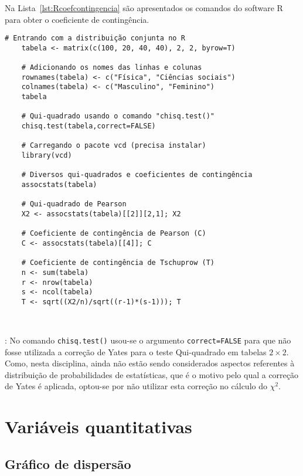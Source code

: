 \documentclass[11pt,fleqn]{book} %
\begin{document}
Na Lista~\ref{lst:Rcoefcontingencia} são apresentados os comandos do software R para obter o coeficiente de contingência.\\

\begin{scriptsize}
	\estiloR
	\begin{lstlisting}[caption={Comandos do software R}, label=lst:Rcoefcontingencia]
	# Entrando com a distribuição conjunta no R
	tabela <- matrix(c(100, 20, 40, 40), 2, 2, byrow=T)
	
	# Adicionando os nomes das linhas e colunas
	rownames(tabela) <- c("Física", "Ciências sociais")
	colnames(tabela) <- c("Masculino", "Feminino")
	tabela

	# Qui-quadrado usando o comando "chisq.test()"
	chisq.test(tabela,correct=FALSE)
	
	# Carregando o pacote vcd (precisa instalar)
	library(vcd)
	
	# Diversos qui-quadrados e coeficientes de contingência
	assocstats(tabela)

	# Qui-quadrado de Pearson
	X2 <- assocstats(tabela)[[2]][2,1]; X2

	# Coeficiente de contingência de Pearson (C)
	C <- assocstats(tabela)[[4]]; C
	
	# Coeficiente de contingência de Tschuprow (T)
	n <- sum(tabela)
	r <- nrow(tabela)
	s <- ncol(tabela)
	T <- sqrt((X2/n)/sqrt((r-1)*(s-1))); T

	
	\end{lstlisting}
\end{scriptsize}

: No comando \texttt{chisq.test()} usou-se o argumento \texttt{correct=FALSE} para que não fosse utilizada a correção de Yates para o teste Qui-quadrado em tabelas $2 \times 2$. Como, nesta disciplina, ainda não estão sendo considerados aspectos referentes à distribuição de probabilidades de estatísticas, que é o motivo pelo qual a correção de Yates é aplicada, optou-se por não utilizar esta correção no cálculo do $\chi^2$. \\




\section{Variáveis quantitativas}

\subsection{Gráfico de dispersão}
\end{document}

